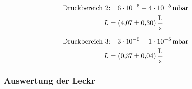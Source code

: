 \begin{align}
  \label{eq:turbo_leit_2}
  \begin{aligned}
    \text{Druckbereich 2} &\text{:}\quad \num{6e-5} - \num{4e-05} \, \text{mbar}& \\
   L&=\SI{4.07\pm 0.30}{\litre\per\second}
\end{aligned}
\end{align}

\begin{align}
  \label{eq:turbo_leit_3}
  \begin{aligned}
    \text{Druckbereich 3} &\text{:}\quad \num{3e-5} - \num{1e-05} \, \text{mbar}& \\
   L&=\SI{0.37\pm 0.04}{\litre\per\second}
\end{aligned}
\end{align}

\subsubsection{Auswertung der Leckr}
